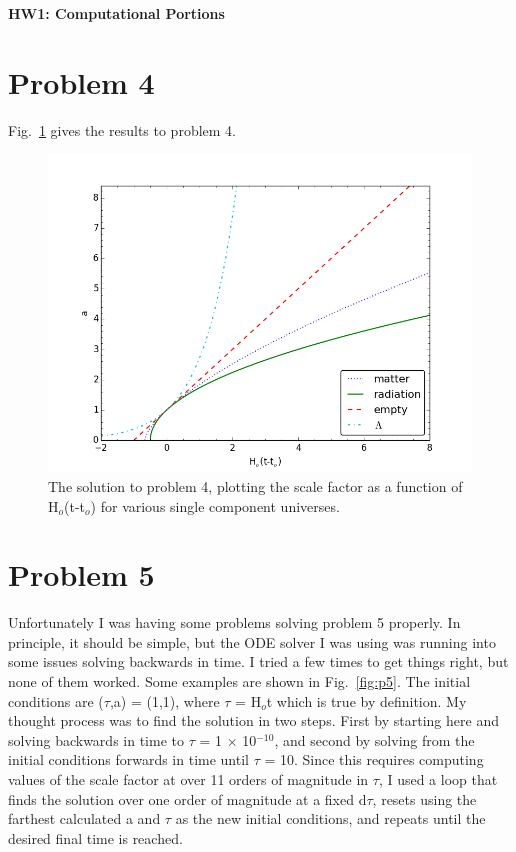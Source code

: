 \documentclass[12pt]{article}%
\begin{document}
\begin{flushleft}
\begin{center}

\Large\textbf{HW1: Computational Portions}
\end{center}

\section{Problem 4}

Fig.~\ref{fig:p4} gives the results to problem 4.

\begin{figure}[tb]
\center
\includegraphics[width=0.9\linewidth]{p4}
\caption{\small The solution to problem 4, plotting the scale factor as a function of H$_o$(t-t$_o$) for various single component universes.}
\label{fig:p4}
\end{figure}

\section{Problem 5}

Unfortunately I was having some problems solving problem 5 properly. In principle, it should be simple, but the ODE solver I was using was running into some issues solving backwards in time. I tried a few times to get things right, but none of them worked. Some examples are shown in Fig.~\ref{fig:p5}. The initial conditions are ($\tau$,a) = (1,1), where $\tau$ = H$_o$t which is true by definition. My thought process was to find the solution in two steps. First by starting here and solving backwards in time to $\tau$ = 1 $\times$ 10$^{-10}$, and second by solving from the initial conditions forwards in time until $\tau$ = 10. Since this requires computing values of the scale factor at over 11 orders of magnitude in $\tau$, I used a loop that finds the solution over one order of magnitude at a fixed d$\tau$, resets using the farthest calculated a and $\tau$ as the new initial conditions, and repeats until the desired final time is reached.


\end{flushleft}
\end{document}
